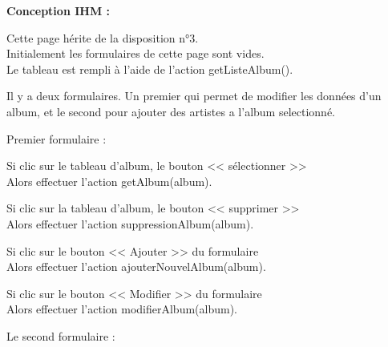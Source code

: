 			\begin{paragraphe}
				\textbf{Conception IHM :}
			\end{paragraphe}

			\begin{paragraphe}
				Cette page hérite de la disposition n°3. \\
				Initialement les formulaires de cette page sont vides. \\
				Le tableau est rempli à l'aide de l'action getListeAlbum().
			\end{paragraphe}


			\begin{paragraphe}
				Il y a deux formulaires. Un premier qui permet de modifier les données d'un album, et le second pour ajouter des artistes a l'album selectionné.
			\end{paragraphe}

			\begin{paragraphe}
				Premier formulaire :
			\end{paragraphe}

			\begin{paragraphe}
				Si clic sur le tableau d'album, le bouton << sélectionner >> \\
				Alors effectuer l'action getAlbum(album).
			\end{paragraphe}

			\begin{paragraphe}
				Si clic sur la tableau d'album, le bouton << supprimer >> \\
				Alors effectuer l'action suppressionAlbum(album).
			\end{paragraphe}

			\begin{paragraphe}
				Si clic sur le bouton << Ajouter >> du formulaire \\
				Alors effectuer l'action ajouterNouvelAlbum(album).
			\end{paragraphe}

			\begin{paragraphe}
				Si clic sur le bouton << Modifier >> du formulaire \\
				Alors effectuer l'action modifierAlbum(album).
			\end{paragraphe}

			\begin{paragraphe}
				Le second formulaire :
			\end{paragraphe}

